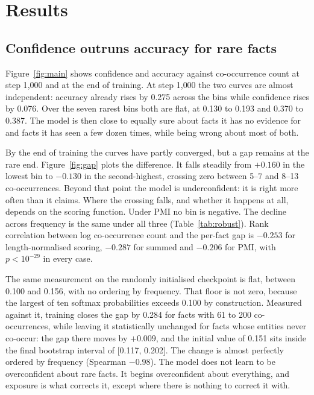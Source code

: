\documentclass[11pt]{article}
\begin{document}
\section{Results}

\subsection{Confidence outruns accuracy for rare facts}

Figure~\ref{fig:main} shows confidence and accuracy against co-occurrence count at step 1{,}000
and at the end of training. At step 1{,}000 the two curves are almost independent: accuracy
already rises by 0.275 across the bins while confidence rises by 0.076. Over the seven rarest
bins both are flat, at 0.130 to 0.193 and 0.370 to 0.387. The model is then close to equally
sure about facts it has no evidence for and facts it has seen a few dozen times, while being
wrong about most of both.

By the end of training the curves have partly converged, but a gap remains at the rare end.
Figure~\ref{fig:gap} plots the difference. It falls steadily from $+0.160$ in the lowest bin to
$-0.130$ in the second-highest, crossing zero between 5--7 and 8--13 co-occurrences. Beyond that
point the model is underconfident: it is right more often than it claims. Where the crossing
falls, and whether it happens at all, depends on the scoring function. Under PMI no bin is
negative. The decline across frequency is the same under all three
(Table~\ref{tab:robust}). Rank correlation between log co-occurrence count and the per-fact
gap is $-0.253$ for length-normalised scoring, $-0.287$ for summed and $-0.206$ for PMI, with
$p < 10^{-29}$ in every case.

The same measurement on the randomly initialised checkpoint is flat, between 0.100 and 0.156,
with no ordering by frequency. That floor is not zero, because the largest of ten softmax
probabilities exceeds 0.100 by construction. Measured against it, training closes the gap by
0.284 for facts with 61 to 200 co-occurrences, while leaving it statistically unchanged for facts
whose entities never co-occur: the gap there moves by $+0.009$, and the initial value of 0.151
sits inside the final bootstrap interval of [0.117, 0.202]. The change is almost perfectly
ordered by frequency (Spearman $-0.98$). The model does not learn to be overconfident about rare
facts. It begins overconfident about everything, and exposure is what corrects it, except where
there is nothing to correct it with.
\end{document}
